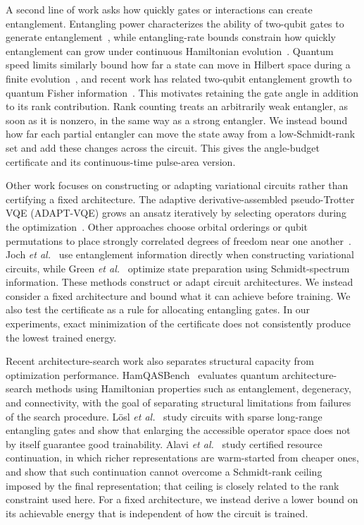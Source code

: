 \documentclass[reprint,aps,pra,floatfix,superscriptaddress,nofootinbib,longbibliography]{revtex4-2}
\theoremstyle{remark}
\theoremstyle{definition}
\begin{document}
A second line of work asks how quickly gates or interactions can create
entanglement. Entangling power characterizes the ability of two-qubit gates to
generate entanglement~\cite{kraus2001optimal,nielsen2003quantum}, while
entangling-rate bounds constrain how quickly entanglement can grow under
continuous Hamiltonian evolution~\cite{bravyi2007upper,vanacoleyen2013entanglement}.
Quantum speed limits similarly bound how far a state can move in Hilbert space
during a finite evolution~\cite{mandelstam1945uncertainty}, and recent work has
related two-qubit entanglement growth to quantum Fisher
information~\cite{saleem2026speed}. This motivates retaining the gate angle in addition to its rank contribution. Rank counting treats an arbitrarily weak
entangler, as soon as it is nonzero, in the same way as a strong entangler. We
instead bound how far each partial entangler can move the state away from a
low-Schmidt-rank set and add these changes across the circuit. This gives the
angle-budget certificate and its continuous-time pulse-area version.

Other work focuses on constructing or adapting variational circuits rather than
certifying a fixed architecture. The adaptive derivative-assembled pseudo-Trotter
VQE (ADAPT-VQE) grows an ansatz iteratively by selecting operators during the
optimization~\cite{grimsley2019adaptive}. Other approaches choose orbital
orderings or qubit permutations to place strongly correlated degrees of freedom
near one another~\cite{tubman2018postponing,tkachenko2021permvqe}. Joch
\emph{et al.}~\cite{joch2025entanglement} use entanglement information directly
when constructing variational circuits, while Green
\emph{et al.}~\cite{green2025schmidt} optimize state preparation using
Schmidt-spectrum information. These methods construct or adapt circuit architectures. We instead consider a
fixed architecture and bound what it can achieve before training. We also test the certificate as a rule for allocating entangling gates. In our experiments, exact minimization of the certificate does not consistently
produce the lowest trained energy.

Recent architecture-search work also separates structural capacity from
optimization performance. HamQASBench~\cite{niu2026hamqasbench} evaluates
quantum architecture-search methods using Hamiltonian properties such as
entanglement, degeneracy, and connectivity, with the goal of separating
structural limitations from failures of the search procedure. L\"osl
\emph{et al.}~\cite{losl2026variational} study circuits with sparse long-range
entangling gates and show that enlarging the accessible operator space does not
by itself guarantee good trainability. Alavi \emph{et al.}~\cite{alavi2026gram}
study certified resource continuation, in which richer representations are
warm-started from cheaper ones, and show that such continuation cannot overcome
a Schmidt-rank ceiling imposed by the final representation; that ceiling is
closely related to the rank constraint used here. For a fixed architecture, we instead derive a
lower bound on its achievable energy that is independent of how the circuit is
trained.
\end{document}
